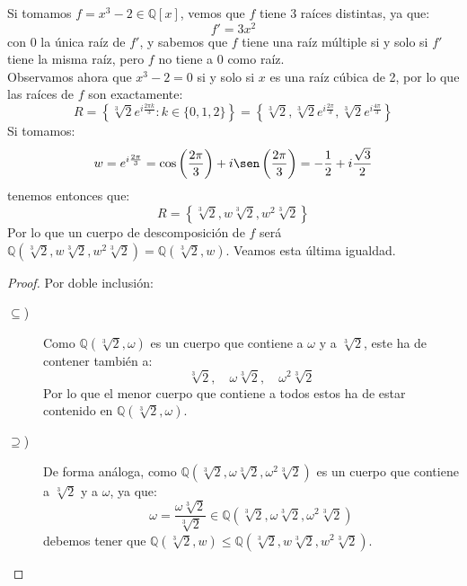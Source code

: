 \begin{ejemplo}\label{ej:x3menos2CuerpoDescomposicion}
    Si tomamos $f=x^3-2\in \mathbb{Q}[x]$, vemos que $f$ tiene 3 raíces distintas, ya que:
    \begin{equation*}
        f' = 3x^2
    \end{equation*}
    con $0$ la única raíz de $f'$, y sabemos que $f$ tiene una raíz múltiple si y solo si $f'$ tiene la misma raíz, pero $f$ no tiene a $0$ como raíz.\\

    \noindent
    Observamos ahora que $x^3-2 = 0$ si y solo si $x$ es una raíz cúbica de 2, por lo que las raíces de $f$ son exactamente:
    \begin{equation*}
        R = \left\{\sqrt[3]{2}e^{i\frac{2\pi k}{3}} : k \in \{0,1,2\}\right\} = \left\{\sqrt[3]{2}, \sqrt[3]{2}e^{i\frac{2\pi}{3}}, \sqrt[3]{2}e^{i\frac{4\pi}{3}}\right\}
    \end{equation*}
    Si tomamos:
    \begin{equation*}
        w = e^{i\frac{2\pi}{3}} = \cos\left(\frac{2\pi}{3}\right) + i \sen\left(\frac{2\pi}{3}\right)  = -\frac{1}{2} + i\frac{\sqrt{3}}{2}
    \end{equation*}
    tenemos entonces que:
    \begin{equation*}
        R = \left\{\sqrt[3]{2},w\sqrt[3]{2},w^2\sqrt[3]{2}\right\}
    \end{equation*}
    Por lo que un cuerpo de descomposición de $f$ será $\mathbb{Q}\left(\sqrt[3]{2},w\sqrt[3]{2},w^2\sqrt[3]{2}\right) = \mathbb{Q}\left(\sqrt[3]{2},w\right)$. Veamos esta última igualdad.
    \begin{proof}
        Por doble inclusión:
        \begin{description}
            \item [$\subseteq$)] Como $\mathbb{Q}\left(\sqrt[3]{2}, \omega\right)$ es un cuerpo que contiene a $\omega$ y a $\sqrt[3]{2}$, este ha de contener también a:
                \begin{equation*}
                    \sqrt[3]{2}, \quad \omega\sqrt[3]{2}, \quad \omega^2 \sqrt[3]{2}
                \end{equation*}
                Por lo que el menor cuerpo que contiene a todos estos ha de estar contenido en $\mathbb{Q}\left(\sqrt[3]{2}, \omega\right)$.
            \item [$\supseteq$)] De forma análoga, como $\mathbb{Q}\left(\sqrt[3]{2}, \omega\sqrt[3]{2}, \omega^2\sqrt[3]{2}\right)$ es un cuerpo que contiene a $\sqrt[3]{2}$ y a $\omega$, ya que:
                \begin{equation*}
                    \omega = \dfrac{\omega \sqrt[3]{2}}{\sqrt[3]{2}} \in \mathbb{Q}\left(\sqrt[3]{2}, \omega\sqrt[3]{2}, \omega^2\sqrt[3]{2}\right)
                \end{equation*}
                debemos tener que $\mathbb{Q}(\sqrt[3]{2},w)\leq \mathbb{Q}\left(\sqrt[3]{2},w\sqrt[3]{2},w^2\sqrt[3]{2}\right)$.\qedhere
        \end{description}
    \end{proof}
\end{ejemplo}

